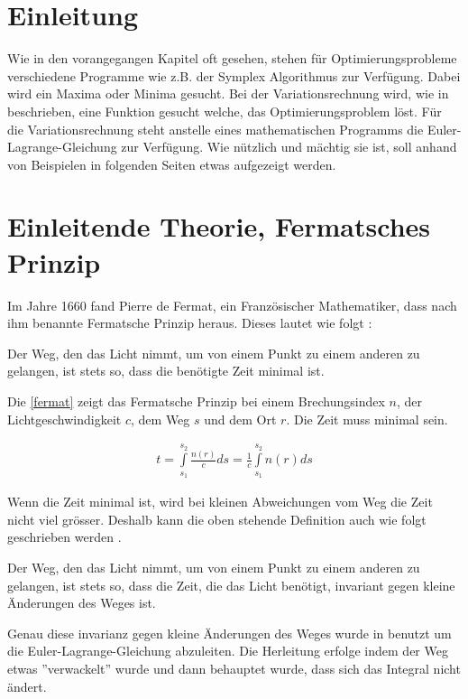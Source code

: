 \section{Einleitung}
Wie in den vorangegangen Kapitel oft gesehen, stehen für Optimierungsprobleme verschiedene Programme wie z.B. der Symplex Algorithmus zur Verfügung. Dabei wird ein Maxima oder Minima gesucht. Bei der Variationsrechnung wird, wie in  beschrieben, eine Funktion gesucht welche, das Optimierungsproblem löst. Für die Variationsrechnung steht anstelle eines mathematischen Programms die Euler-Lagrange-Gleichung zur Verfügung. Wie nützlich und mächtig sie ist, soll anhand von Beispielen in folgenden Seiten etwas aufgezeigt werden.

\section{Einleitende Theorie, Fermatsches Prinzip}

Im Jahre 1660 fand Pierre de Fermat, ein Französischer Mathematiker, dass  nach ihm benannte Fermatsche Prinzip heraus. 
Dieses lautet wie folgt \cite{DefinitionFermat}:

\begin{postulat}
	Der Weg, den das Licht nimmt, 
	um von einem Punkt zu einem anderen zu gelangen, 
	ist stets so, dass die benötigte Zeit minimal ist.
\end{postulat}

Die \eqref{fermat} zeigt das Fermatsche Prinzip bei einem Brechungsindex $n$, 
der Lichtgeschwindigkeit $c$, dem Weg $s$ und dem Ort $r$. Die Zeit muss minimal sein.

\begin{align}
	t= \int\limits_{s_1}^{s_2} \frac{n(r)}{c} ds = \frac{1}{c} \int\limits_{s_1}^{s_2} n(r) ds
	\label{fermat}
\end{align}


Wenn die Zeit minimal ist, wird bei kleinen Abweichungen vom Weg die Zeit nicht viel grösser. 
Deshalb kann die oben stehende Definition auch wie folgt geschrieben werden \cite{DefinitionFermat}.

\begin{postulat}
Der Weg, den das Licht nimmt,  um von einem Punkt zu einem anderen zu gelangen, 
ist stets so, dass die Zeit, die das Licht benötigt, invariant gegen kleine Änderungen des Weges ist.
\end{postulat}
Genau diese invarianz gegen kleine Änderungen des Weges wurde in  benutzt um die Euler-Lagrange-Gleichung abzuleiten. Die Herleitung erfolge indem der Weg etwas ''verwackelt'' wurde und dann behauptet wurde, dass sich das Integral nicht ändert.


